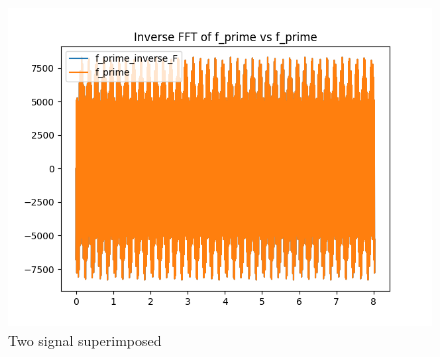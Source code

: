 \documentclass{article}
\begin{document}
\begin{figure}[H]
    \includegraphics[width=\textwidth]{HW2_3d.png}
    \caption{Two signal superimposed}
\end{figure}
\end{document}
